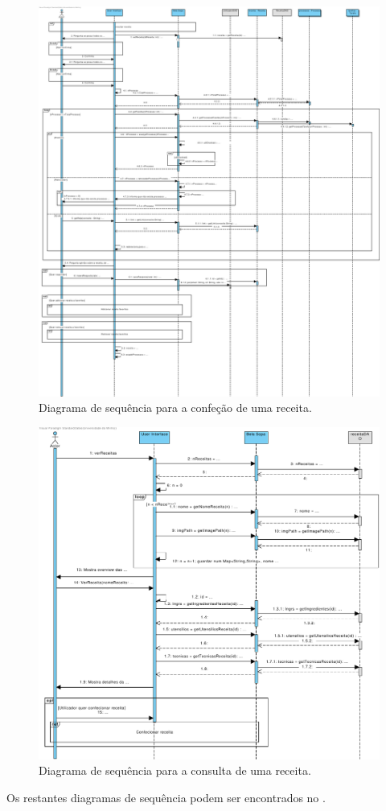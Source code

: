 \begin{figure}[H]
   \centering
   \includegraphics[width=\textwidth]{figures/10/Confecionar_receita.pdf}
   \caption{Diagrama de sequência para a confeção de uma receita.}
   \label{fig:negocio:DiagramaSequencia1}
 \end{figure}

\begin{figure}[H]
   \centering
   \includegraphics[width=\textwidth]{figures/10/Consultar_receita.pdf}
   \caption{Diagrama de sequência para a consulta de uma receita.}
   \label{fig:negocio:DiagramaSequencia2}
 \end{figure}
 
 Os restantes diagramas de sequência podem ser encontrados no . 

